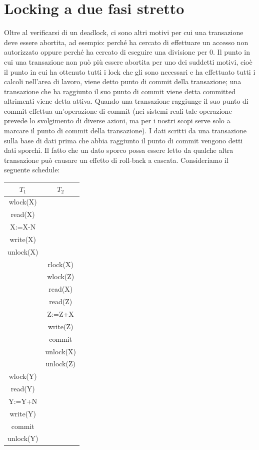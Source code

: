 \section{Locking a due fasi stretto}
Oltre al verificarsi di un deadlock, ci sono altri motivi per cui una transazione deve essere abortita, ad esempio: perché ha cercato di effettuare un accesso non autorizzato oppure perché ha cercato di eseguire una divisione per 0. Il punto in cui una transazione non può più essere abortita per uno dei suddetti motivi, cioè il punto in cui ha ottenuto tutti i lock che gli sono necessari e ha effettuato tutti i calcoli nell'area di lavoro, viene detto punto di commit della transazione; una transazione che ha raggiunto il suo punto di commit viene detta committed altrimenti viene detta attiva. Quando una transazione raggiunge il suo punto di commit effettua un'operazione di commit (nei sistemi reali tale operazione prevede lo svolgimento di diverse azioni, ma per i nostri scopi serve solo a marcare il punto di commit della transazione). I dati scritti da una transazione sulla base di dati prima che abbia raggiunto il punto di commit vengono detti dati sporchi. Il fatto che un dato sporco possa essere letto da qualche altra  transazione può causare un effetto di roll-back a cascata. Consideriamo il seguente schedule:
\begin{center}
    \begin{tabular}{|c|c|}
        \hline $T_1$ & $T_2$\\\hline
        wlock(X)& \\
        read(X)& \\
        X:=X-N& \\
        write(X)& \\
        unlock(X)& \\
        & rlock(X)\\
        & wlock(Z)\\
        & read(X)\\
        & read(Z)\\
        & Z:=Z+X\\
        & write(Z)\\
        & commit\\
        & unlock(X)\\
        & unlock(Z)\\
        wlock(Y) & \\
        read(Y) & \\
        Y:=Y+N & \\
        write(Y) & \\
        commit & \\
        unlock(Y) & \\\hline
    \end{tabular}
\end{center}
